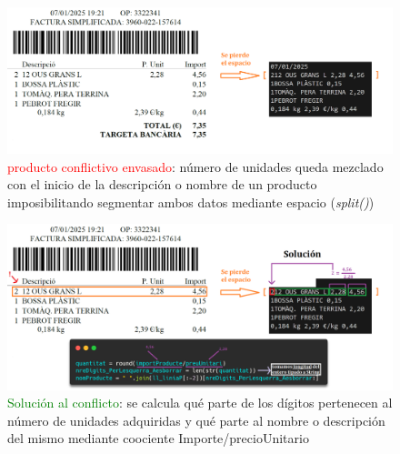 \documentclass{beamer}
\begin{document}
	
		\begin{frame}	
			\begin{figure}
				\centering
				\includegraphics[width=1\linewidth]{imgEspecifiques/ticketExtraccioN}
				\caption{\textcolor{red}{producto conflictivo envasado}: número de unidades queda mezclado con el inicio de la descripción o nombre de un producto imposibilitando segmentar ambos datos mediante espacio (\textit{split()})}
				\label{fig:ticketextraccionN}
			\end{figure}
		\end{frame}
		
		
		\begin{frame}	
			\begin{figure}
				\centering
				\includegraphics[width=1\linewidth]{imgEspecifiques/ticketExtraccioO}
				\caption{\textcolor{green}{Solución al conflicto}: se calcula qué parte de los dígitos pertenecen al número de unidades adquiridas y qué parte al nombre o descripción del mismo mediante coociente Importe/precioUnitario}
				\label{fig:ticketextraccionO}
			\end{figure}
		\end{frame}
			
			
	
\end{document}

